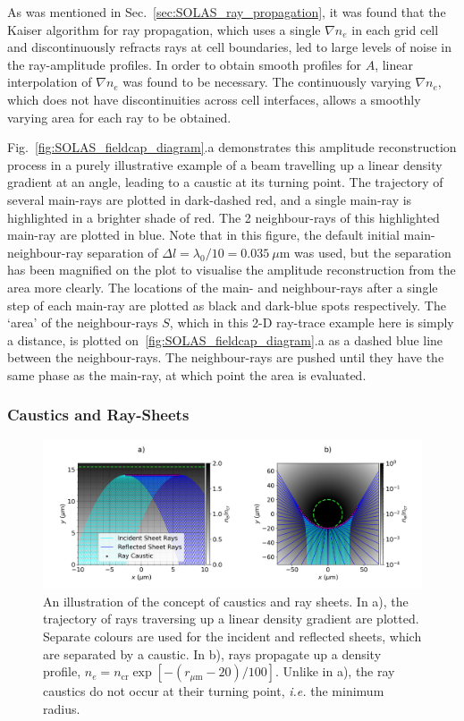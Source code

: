 As was mentioned in Sec.~\ref{sec:SOLAS_ray_propagation}, it was found that the Kaiser algorithm for ray propagation, which uses a single $\nabla n_e$ in each grid cell and discontinuously refracts rays at cell boundaries, led to large levels of noise in the ray-amplitude profiles.
In order to obtain smooth profiles for $A$, linear interpolation of $\nabla n_e$ was found to be necessary.
The continuously varying $\nabla n_e$, which does not have discontinuities across cell interfaces, allows a smoothly varying area for each ray to be obtained.

Fig.~\ref{fig:SOLAS_fieldcap_diagram}.a demonstrates this amplitude reconstruction process in a purely illustrative example of a beam travelling up a linear density gradient at an angle, leading to a caustic at its turning point.
The trajectory of several main-rays are plotted in dark-dashed red, and a single main-ray is highlighted in a brighter shade of red.
The 2 neighbour-rays of this highlighted main-ray are plotted in blue.
Note that in this figure, the default initial main-neighbour-ray separation of $\Delta l=\lambda_0/10=0.035\ \mu\text{m}$ was used, but the separation has been magnified on the plot to visualise the amplitude reconstruction from the area more clearly.
The locations of the main- and neighbour-rays after a single step of each main-ray are plotted as black and dark-blue spots respectively.
The `area' of the neighbour-rays $S$, which in this 2-D ray-trace example here is simply a distance, is plotted on~\ref{fig:SOLAS_fieldcap_diagram}.a as a dashed blue line between the neighbour-rays.
The neighbour-rays are pushed until they have the same phase as the main-ray, at which point the area is evaluated.

\subsubsection{Caustics and Ray-Sheets}%
\label{sec:SOLAS_caustics}

\begin{figure}[t!]
    \includegraphics[width=\linewidth]{Numerics/Images/Raysheets_withcyl.png}
    \centering
    \caption{An illustration of the concept of caustics and ray sheets.
    In a), the trajectory of rays traversing up a linear density gradient are plotted.
    Separate colours are used for the incident and reflected sheets, which are separated by a caustic.
    In b), rays propagate up a density profile, $n_e=n_{\text{cr}}\exp{[ -(r_{\mu\text{m}}-20)/100 ]}$.
    Unlike in a), the ray caustics do not occur at their turning point, \textit{i.e.} the minimum radius.}%
    \label{fig:SOLAS_sheet_diagram}
\end{figure}

